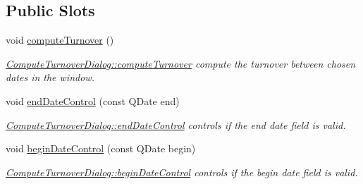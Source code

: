\subsection*{Public Slots}
\begin{DoxyCompactItemize}
\item 
\hypertarget{classGui_1_1Dialogs_1_1ComputeTurnoverDialog_ab4d2a48bffed8c09e3d16e2849fd4b0e}{}void \hyperlink{classGui_1_1Dialogs_1_1ComputeTurnoverDialog_ab4d2a48bffed8c09e3d16e2849fd4b0e}{compute\+Turnover} ()\label{classGui_1_1Dialogs_1_1ComputeTurnoverDialog_ab4d2a48bffed8c09e3d16e2849fd4b0e}

\begin{DoxyCompactList}\small\item\em \hyperlink{classGui_1_1Dialogs_1_1ComputeTurnoverDialog_ab4d2a48bffed8c09e3d16e2849fd4b0e}{Compute\+Turnover\+Dialog\+::compute\+Turnover} compute the turnover between chosen dates in the window. \end{DoxyCompactList}\item 
void \hyperlink{classGui_1_1Dialogs_1_1ComputeTurnoverDialog_adaa4564ae195b0bf3c7e9ae5058b2603}{end\+Date\+Control} (const Q\+Date end)
\begin{DoxyCompactList}\small\item\em \hyperlink{classGui_1_1Dialogs_1_1ComputeTurnoverDialog_adaa4564ae195b0bf3c7e9ae5058b2603}{Compute\+Turnover\+Dialog\+::end\+Date\+Control} controls if the {\itshape end} date field is valid. \end{DoxyCompactList}\item 
void \hyperlink{classGui_1_1Dialogs_1_1ComputeTurnoverDialog_a0ded716ae88bbd69363e24940eb48d3a}{begin\+Date\+Control} (const Q\+Date begin)
\begin{DoxyCompactList}\small\item\em \hyperlink{classGui_1_1Dialogs_1_1ComputeTurnoverDialog_a0ded716ae88bbd69363e24940eb48d3a}{Compute\+Turnover\+Dialog\+::begin\+Date\+Control} controls if the {\itshape begin} date field is valid. \end{DoxyCompactList}\end{DoxyCompactItemize}
